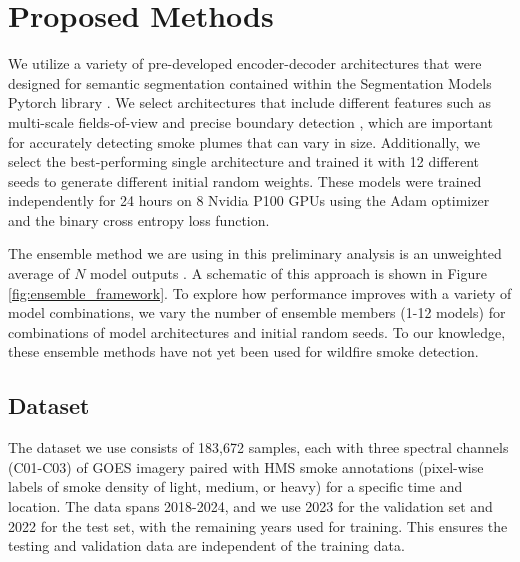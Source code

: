 \documentclass{article}
\begin{document}

\section{Proposed Methods}
We utilize a variety of pre-developed encoder-decoder architectures that were designed for semantic segmentation contained within the Segmentation Models Pytorch library \citep{semantic}. We select architectures that include different features such as multi-scale fields-of-view and precise boundary detection \citep{dlv3p,PAN,UNetpp}, which are important for accurately detecting smoke plumes that can vary in size. Additionally, we select the best-performing single architecture and trained it with 12 different seeds to generate different initial random weights. These models were trained independently for 24 hours on 8 Nvidia P100 GPUs using the Adam optimizer and the binary cross entropy loss function. 

The ensemble method we are using in this preliminary analysis is an unweighted average of $N$ model outputs \citep{nn-ensemble2}. A schematic of this approach is shown in Figure \ref{fig:ensemble_framework}. To explore how performance improves with a variety of model combinations, we vary the number of ensemble members (1-12 models) for combinations of model architectures and initial random seeds. To our knowledge, these ensemble methods have not yet been used for wildfire smoke detection.

\subsection{Dataset}
The dataset we use consists of 183,672 samples, each with three spectral channels (C01-C03) of GOES imagery paired with HMS smoke annotations (pixel-wise labels of smoke density of light, medium, or heavy) for a specific time and location. The data spans 2018-2024, and we use 2023 for the validation set and 2022 for the test set, with the remaining years used for training. This ensures the testing and validation data are independent of the training data.
\end{document}
